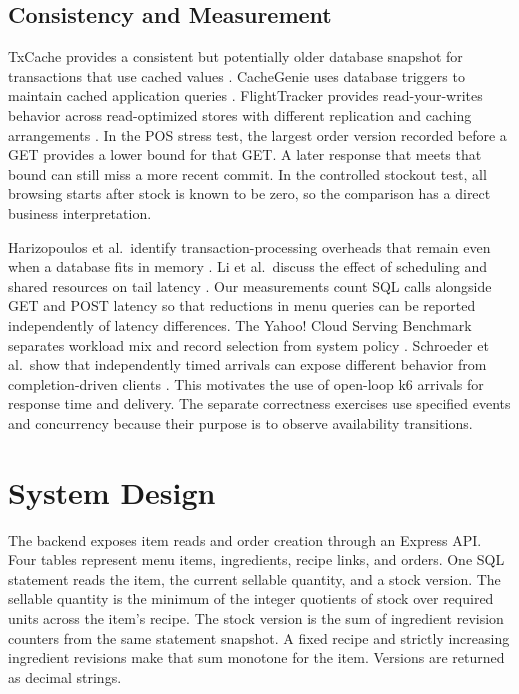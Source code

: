 \documentclass[conference]{IEEEtran}
\begin{document}
\subsection{Consistency and Measurement}

TxCache provides a consistent but potentially older database snapshot for transactions that use cached values \cite{ports2010}. CacheGenie uses database triggers to maintain cached application queries \cite{gupta2011}. FlightTracker provides read-your-writes behavior across read-optimized stores with different replication and caching arrangements \cite{shi2020}. In the POS stress test, the largest order version recorded before a GET provides a lower bound for that GET. A later response that meets that bound can still miss a more recent commit. In the controlled stockout test, all browsing starts after stock is known to be zero, so the comparison has a direct business interpretation.

Harizopoulos et al.\ identify transaction-processing overheads that remain even when a database fits in memory \cite{harizopoulos2008}. Li et al.\ discuss the effect of scheduling and shared resources on tail latency \cite{li2014}. Our measurements count SQL calls alongside GET and POST latency so that reductions in menu queries can be reported independently of latency differences. The Yahoo! Cloud Serving Benchmark separates workload mix and record selection from system policy \cite{cooper2010}. Schroeder et al.\ show that independently timed arrivals can expose different behavior from completion-driven clients \cite{schroeder2006}. This motivates the use of open-loop k6 arrivals for response time and delivery. The separate correctness exercises use specified events and concurrency because their purpose is to observe availability transitions.

\section{System Design}

The backend exposes item reads and order creation through an Express API. Four tables represent menu items, ingredients, recipe links, and orders. One SQL statement reads the item, the current sellable quantity, and a stock version. The sellable quantity is the minimum of the integer quotients of stock over required units across the item's recipe. The stock version is the sum of ingredient revision counters from the same statement snapshot. A fixed recipe and strictly increasing ingredient revisions make that sum monotone for the item. Versions are returned as decimal strings.
\end{document}
